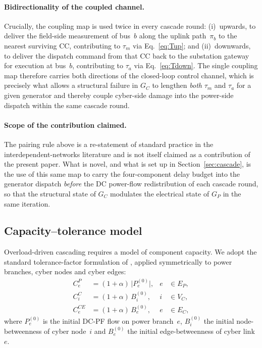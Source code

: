 \paragraph{Bidirectionality of the coupled channel.}
Crucially, the coupling map is used twice in every cascade round:
(i)~upwards, to deliver the field-side measurement of bus~$b$ along
the uplink path~$\pi_b$ to the nearest surviving CC, contributing
to $\tau_m$ via Eq.~\eqref{eq:Tup}; and (ii)~downwards, to deliver
the dispatch command from that CC back to the substation gateway
for execution at bus~$b$, contributing to $\tau_a$ via
Eq.~\eqref{eq:Tdown}.  The single coupling map therefore carries
both directions of the closed-loop control channel, which is
precisely what allows a structural failure in $G_C$ to lengthen
\emph{both} $\tau_m$ and $\tau_a$ for a given generator and
thereby couple cyber-side damage into the power-side dispatch
within the same cascade round.

\paragraph{Scope of the contribution claimed.}
The pairing rule above is a re-statement of standard practice in
the interdependent-networks literature
\citep{Buldyrev2010,Brummitt2012,ChenTu2026} and is not itself
claimed as a contribution of the present paper.  What is novel,
and what is set up in Section~\ref{sec:cascade}, is the use of
this same map to carry the four-component delay budget into the
generator dispatch \emph{before} the DC power-flow redistribution
of each cascade round, so that the structural state of $G_C$
modulates the electrical state of $G_P$ in the same iteration.

\subsection{Capacity--tolerance model}\label{sec:capacity}

Overload-driven cascading requires a model of component capacity.
We adopt the standard tolerance-factor formulation of
\citet{Motter2002}, applied symmetrically to power branches, cyber
nodes and cyber edges:
\begin{align}
  C_e^{P}   &= (1+\alpha)\,\bigl|P_e^{(0)}\bigr|, &
  e&\in E_P, \label{eq:cap_P}\\
  C_i^{C}   &= (1+\alpha)\,B_i^{(0)}, &
  i&\in V_C, \label{eq:cap_Cn}\\
  C_e^{CE}  &= (1+\alpha)\,B_e^{(0)}, &
  e&\in E_C, \label{eq:cap_Ce}
\end{align}
where $P_e^{(0)}$ is the initial DC-PF flow on power branch~$e$,
$B_i^{(0)}$ the initial node-betweenness of cyber node~$i$ and
$B_e^{(0)}$ the initial edge-betweenness of cyber link~$e$.

